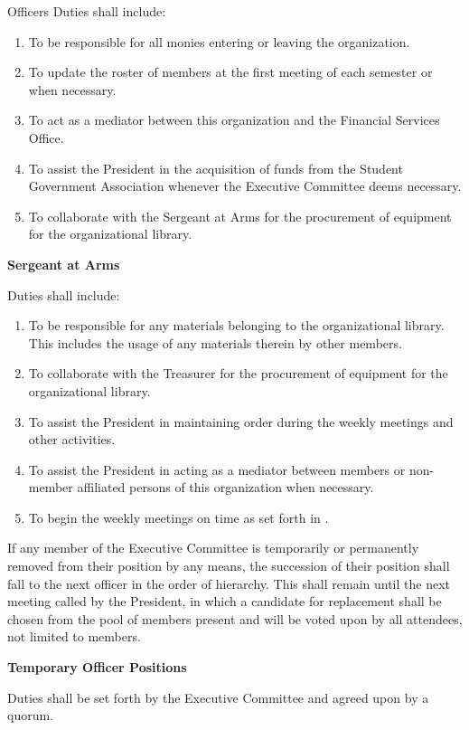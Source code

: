 {\begin{article}{Officers}
	Duties shall include:
	\begin{enumerate}
		\item To be responsible for all monies entering or leaving the organization.
		\item To update the roster of members at the first meeting of each semester or when necessary.
		\item To act as a mediator between this organization and the Financial Services Office.
		\item To assist the President in the acquisition of funds from the Student Government Association whenever the Executive Committee deems necessary.
		\item To collaborate with the Sergeant at Arms for the procurement of equipment for the organizational library.
	\end{enumerate}
	\item \textbf{Sergeant at Arms}

	Duties shall include:
	\begin{enumerate}
		\item To be responsible for any materials belonging to the organizational library. This includes the usage of any materials therein by other members.
		\item To collaborate with the Treasurer for the procurement of equipment for the organizational library.
		\item To assist the President in maintaining order during the weekly meetings and other activities.
		\item To assist the President in acting as a mediator between members or non-member affiliated persons of this organization when necessary.
		\item To begin the weekly meetings on time as set forth in .
	\end{enumerate}
	\item If any member of the Executive Committee is temporarily or permanently removed from their position by any means, the succession of their position shall fall to the next officer in the order of hierarchy.  This shall remain until the next meeting called by the President, in which a candidate for replacement shall be chosen from the pool of members present and will be voted upon by all attendees, not limited to members.
	\item \textbf{Temporary Officer Positions}

	Duties shall be set forth by the Executive Committee and agreed upon by a quorum.


\end{article}}
